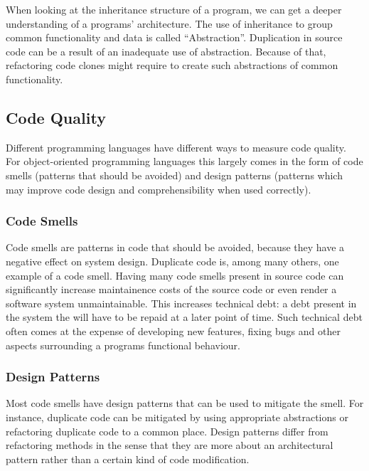 When looking at the inheritance structure of a program, we can get a deeper understanding of a programs' architecture. The use of inheritance to group common functionality and data is called ``Abstraction''. Duplication in source code can be a result of an inadequate use of abstraction. Because of that, refactoring code clones might require to create such abstractions of common functionality.

\subsection{Code Quality}
Different programming languages have different ways to measure code quality. For object-oriented programming languages this largely comes in the form of code smells (patterns that should be avoided) and design patterns (patterns which may improve code design and comprehensibility when used correctly).

\subsubsection{Code Smells}
Code smells are patterns in code that should be avoided, because they have a negative effect on system design. Duplicate code is, among many others, one example of a code smell. Having many code smells present in source code can significantly increase maintainence costs of the source code or even render a software system unmaintainable. This increases technical debt: a debt present in the system the will have to be repaid at a later point of time. Such technical debt often comes at the expense of developing new features, fixing bugs and other aspects surrounding a programs functional behaviour.

\subsubsection{Design Patterns}
Most code smells have design patterns that can be used to mitigate the smell. For instance, duplicate code can be mitigated by using appropriate abstractions or refactoring duplicate code to a common place. Design patterns differ from refactoring methods in the sense that they are more about an architectural pattern rather than a certain kind of code modification.

